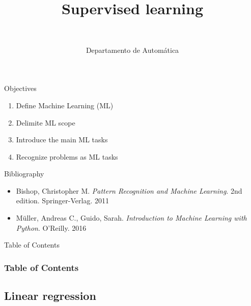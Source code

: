 \documentclass[10pt,compress]{beamer} %
\title[Supervised learning]{Supervised learning}
\author{\asignatura\\\carrera}
\institute{}
\date{Departamento de Automática}
\begin{document}
{\titlepageBlue
    \begin{frame}
        \titlepage
    \end{frame}
}

\institute{\asignatura}

\begin{frame}[plain]{}
   \begin{block}{Objectives}
      \begin{enumerate}
         \item Define Machine Learning (ML)
		 \item Delimite ML scope
         \item Introduce the main ML tasks
         \item Recognize problems as ML tasks
      \end{enumerate} 
   \end{block}

   \begin{block}{Bibliography}
	\begin{itemize}
        \item Bishop, Christopher M. \textit{Pattern Recognition and Machine Learning}. 2nd edition. Springer-Verlag. 2011
        \item M\"uller, Andreas C., Guido, Sarah. \textit{Introduction to Machine Learning with Python}. O'Reilly. 2016
	\end{itemize}
   \end{block}
\end{frame}

{
\begin{frame}[shrink]{Table of Contents}

 	\frametitle{Table of Contents}
  	\begin{multicols}{2}
  		\tableofcontents
    \end{multicols}

\end{frame}
}

\subsection{Linear regression}
\end{document}
